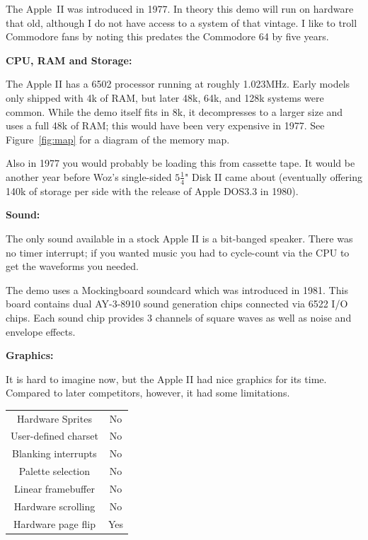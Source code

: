 \documentclass[twocolumn]{article}
\begin{document}
The Apple~II was introduced in 1977.
In theory this demo will run on hardware that old, although I do
not have access to a system of that vintage.
I like to troll Commodore fans by noting this predates the Commodore 64 by 
five years.



\vspace{1ex}
\noindent
{\bf CPU, RAM and Storage:}

The Apple II has a 6502 processor running at roughly 1.023MHz.
Early models only shipped with 4k of RAM, but later 48k, 64k, and 128k
systems were common.
While the demo itself fits in 8k, it decompresses to a larger size and uses
a full 48k of RAM;
this would have been very expensive in 1977.
See Figure~\ref{fig:map} for a diagram of the memory map.

Also in 1977 you would probably be loading this from cassette tape.
It would be another year before Woz's single-sided
$5\frac{1}{4}$" Disk II came about (eventually offering 140k of
storage per side with the release of Apple DOS3.3 in 1980). 
	
\vspace{1ex}
\noindent
{\bf Sound:}

The only sound available in a stock Apple II is a bit-banged speaker.
There was no timer interrupt; if you wanted music you had to cycle-count
via the CPU to get the waveforms you needed.

The demo uses a Mockingboard soundcard which was introduced in 1981.
This board contains dual AY-3-8910 sound generation chips connected via
6522 I/O chips.
Each sound chip provides 3 channels of square waves as well as noise and
envelope effects.

\vspace{1ex}
\noindent
{\bf Graphics:}

It is hard to imagine now, but the Apple II had nice graphics for its time.
Compared to later competitors, however, it had some limitations.

\begin{center}
\begin{tabular}{|c|c|}
\hline
Hardware Sprites     &	No \\
User-defined charset &	No \\
Blanking interrupts  &	No \\
Palette selection    &	No \\
Linear framebuffer   &	No \\
Hardware scrolling   &	No \\
Hardware page flip   &	Yes \\
\hline
\end{tabular}
\end{center}
\end{document}
